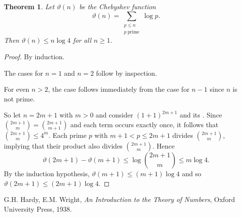 \documentclass[12pt]{article}
\newtheorem*{theorem*}{Theorem}
\begin{document}

\begin{theorem*}
Let $\vartheta(n)$ be the Chebyshev function
\[
\vartheta(n)=\sum_{\substack{p\le n\\p{\:\mathrm{prime}}}} \log p.
\]
Then $\vartheta(n)\le n\log 4$ for all $n\ge 1$.
\end{theorem*}

\begin{proof}
By induction.

The cases for $n=1$ and $n=2$ follow by inspection.

For even $n>2$, the case follows immediately from the case for $n-1$ since $n$ is not prime.

So let $n=2m+1$ with $m>0$ and consider $(1+1)^{2m+1}$ and its . Since $\displaystyle {{2m+1}\choose m}={{2m+1}\choose{m+1}}$ and each term occurs exactly once, it follows that $\displaystyle {{2m+1}\choose m}\leq 4^m$. Each prime $p$ with $m+1<p\leq 2m+1$ divides ${2m+1}\choose m$, implying that their product also divides $\displaystyle {{2m+1}\choose m}$.  Hence
\[
\vartheta(2m+1)-\vartheta(m+1)\le\log{{2m+1}\choose m}\le m\log 4.
\]
By the induction hypothesis, $\vartheta(m+1)\leq(m+1)\log4$ and so $\vartheta(2m+1)\leq(2m+1)\log4$.
\end{proof}

\begin{thebibliography}{9}
G.H. Hardy, E.M. Wright, \emph{An Introduction to the Theory of Numbers}, Oxford University Press, 1938.
\end{thebibliography}
\end{document}

